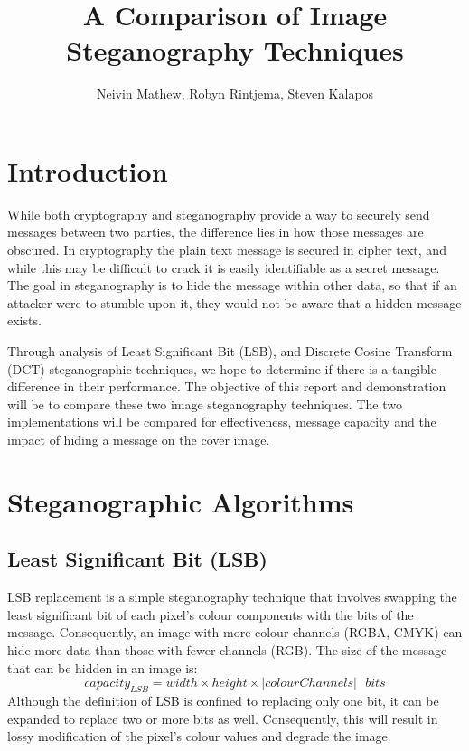 \documentclass[11pt,letterpaper]{article}
\title{A Comparison of Image Steganography Techniques}
\author{Neivin Mathew, Robyn Rintjema, Steven Kalapos}
\begin{document}
\begin{titlepage}
	\maketitle
	\thispagestyle{empty}
\end{titlepage}

\clearpage
\section{Introduction}
While both cryptography and steganography provide a way to securely send messages between two parties, the difference lies in how those messages are obscured. In cryptography the plain text message is secured in cipher text, and while this may be difficult to crack it is easily identifiable as a secret message. The goal in steganography is to hide the message within other data, so that if an attacker were to stumble upon it, they would not be aware that a hidden message exists.

Through analysis of Least Significant Bit (LSB), and Discrete Cosine Transform (DCT) steganographic techniques, we hope to determine if there is a tangible difference in their performance.  The objective of this report and demonstration will be to compare these two image steganography techniques. The two implementations will be compared for effectiveness, message capacity and the impact of hiding a message on the cover image.

\section{Steganographic Algorithms}
\subsection{Least Significant Bit (LSB)}
LSB replacement is a simple steganography technique that involves swapping the least significant bit of each pixel's colour components with the bits of the message. Consequently, an image with more colour channels (RGBA, CMYK) can hide more data than those with fewer channels (RGB).
The size of the message that can be hidden in an image is:
$$capacity_{LSB} = width \times height \times |colourChannels| \ \ \ bits$$
Although the definition of LSB is confined to replacing only one bit, it can be expanded to replace two or more bits as well. Consequently, this will result in lossy modification of the pixel's colour values and degrade the image.
\end{document}
